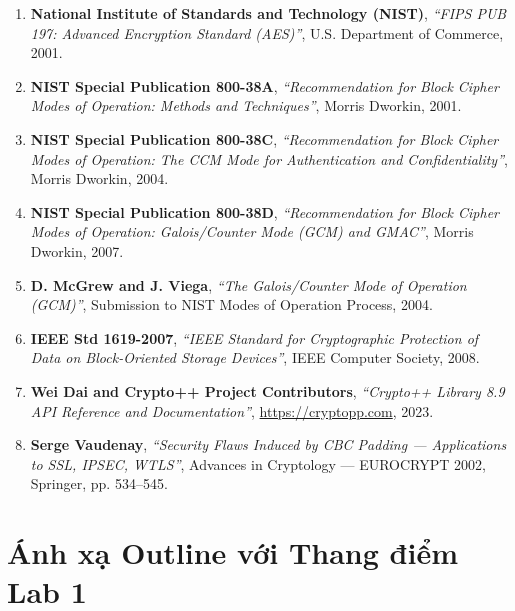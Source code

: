 \documentclass[12pt, a4paper]{report}
\begin{document}
\begin{enumerate}
    \item \textbf{National Institute of Standards and Technology (NIST)}, \textit{``FIPS PUB 197: Advanced Encryption Standard (AES)''}, U.S. Department of Commerce, 2001.
    \item \textbf{NIST Special Publication 800-38A}, \textit{``Recommendation for Block Cipher Modes of Operation: Methods and Techniques''}, Morris Dworkin, 2001.
    \item \textbf{NIST Special Publication 800-38C}, \textit{``Recommendation for Block Cipher Modes of Operation: The CCM Mode for Authentication and Confidentiality''}, Morris Dworkin, 2004.
    \item \textbf{NIST Special Publication 800-38D}, \textit{``Recommendation for Block Cipher Modes of Operation: Galois/Counter Mode (GCM) and GMAC''}, Morris Dworkin, 2007.
    \item \textbf{D. McGrew and J. Viega}, \textit{``The Galois/Counter Mode of Operation (GCM)''}, Submission to NIST Modes of Operation Process, 2004.
    \item \textbf{IEEE Std 1619-2007}, \textit{``IEEE Standard for Cryptographic Protection of Data on Block-Oriented Storage Devices''}, IEEE Computer Society, 2008.
    \item \textbf{Wei Dai and Crypto++ Project Contributors}, \textit{``Crypto++ Library 8.9 API Reference and Documentation''}, \url{https://cryptopp.com}, 2023.
    \item \textbf{Serge Vaudenay}, \textit{``Security Flaws Induced by CBC Padding --- Applications to SSL, IPSEC, WTLS''}, Advances in Cryptology --- EUROCRYPT 2002, Springer, pp. 534--545.
\end{enumerate}

\chapter*{Ánh xạ Outline với Thang điểm Lab 1}
\end{document}
